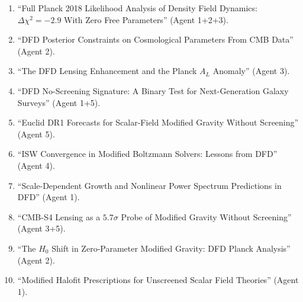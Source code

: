 \documentclass[11pt,a4paper]{article}
\begin{document}
\begin{enumerate}
\item ``Full Planck 2018 Likelihood Analysis of Density Field Dynamics: $\Delta\chi^2 = -2.9$ With Zero Free Parameters'' (Agent 1+2+3).
\item ``DFD Posterior Constraints on Cosmological Parameters From CMB Data'' (Agent 2).
\item ``The DFD Lensing Enhancement and the Planck $A_L$ Anomaly'' (Agent 3).
\item ``DFD No-Screening Signature: A Binary Test for Next-Generation Galaxy Surveys'' (Agent 1+5).
\item ``Euclid DR1 Forecasts for Scalar-Field Modified Gravity Without Screening'' (Agent 5).
\item ``ISW Convergence in Modified Boltzmann Solvers: Lessons from DFD'' (Agent 4).
\item ``Scale-Dependent Growth and Nonlinear Power Spectrum Predictions in DFD'' (Agent 1).
\item ``CMB-S4 Lensing as a $5.7\sigma$ Probe of Modified Gravity Without Screening'' (Agent 3+5).
\item ``The $H_0$ Shift in Zero-Parameter Modified Gravity: DFD Planck Analysis'' (Agent 2).
\item ``Modified Halofit Prescriptions for Unscreened Scalar Field Theories'' (Agent 1).
\end{enumerate}
\end{document}
